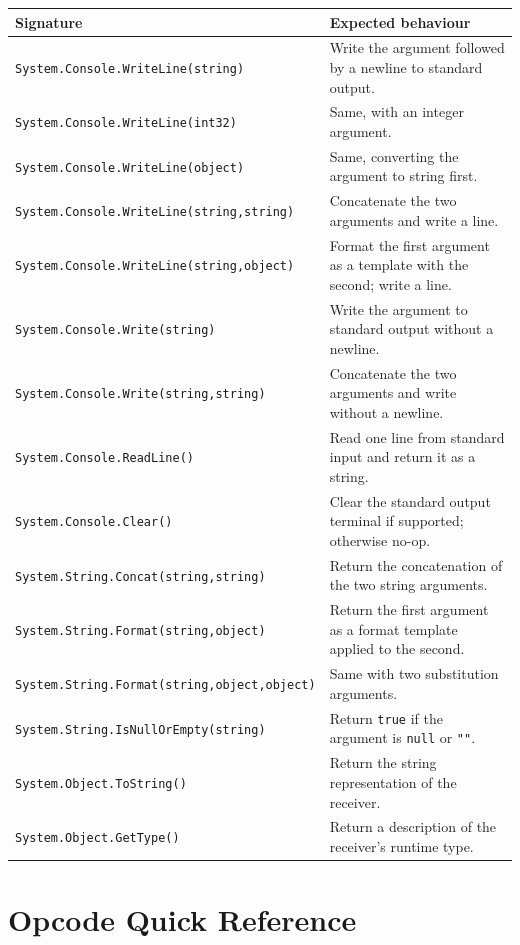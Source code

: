 \documentclass[11pt,a4paper]{article}
\begin{document}
\begin{longtable}{lp{7.5cm}}
  \toprule
  \textbf{Signature} & \textbf{Expected behaviour} \\
  \midrule
  \endhead
  \texttt{System.Console.WriteLine(string)}
    & Write the argument followed by a newline to standard output. \\
  \texttt{System.Console.WriteLine(int32)}
    & Same, with an integer argument. \\
  \texttt{System.Console.WriteLine(object)}
    & Same, converting the argument to string first. \\
  \texttt{System.Console.WriteLine(string,string)}
    & Concatenate the two arguments and write a line. \\
  \texttt{System.Console.WriteLine(string,object)}
    & Format the first argument as a template with the second; write a line. \\
  \texttt{System.Console.Write(string)}
    & Write the argument to standard output without a newline. \\
  \texttt{System.Console.Write(string,string)}
    & Concatenate the two arguments and write without a newline. \\
  \texttt{System.Console.ReadLine()}
    & Read one line from standard input and return it as a string. \\
  \texttt{System.Console.Clear()}
    & Clear the standard output terminal if supported; otherwise no-op. \\
  \texttt{System.String.Concat(string,string)}
    & Return the concatenation of the two string arguments. \\
  \texttt{System.String.Format(string,object)}
    & Return the first argument as a format template applied to the second. \\
  \texttt{System.String.Format(string,object,object)}
    & Same with two substitution arguments. \\
  \texttt{System.String.IsNullOrEmpty(string)}
    & Return \texttt{true} if the argument is \texttt{null} or \texttt{""}. \\
  \texttt{System.Object.ToString()}
    & Return the string representation of the receiver. \\
  \texttt{System.Object.GetType()}
    & Return a description of the receiver's runtime type. \\
  \bottomrule
\end{longtable}

\section{Opcode Quick Reference}
\label{app:opcodes}
\end{document}
